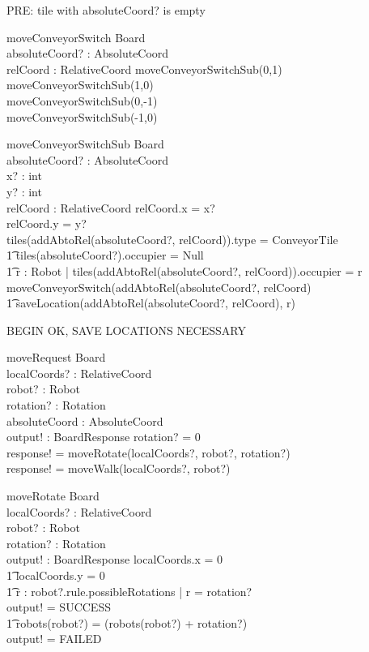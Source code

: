 \documentclass[a4paper,11pt]{article}
\begin{document}
PRE: tile with absoluteCoord? is empty
\begin{schema}{moveConveyorSwitch}
\Delta Board \\
absoluteCoord? : AbsoluteCoord \\
relCoord : RelativeCoord
\where
moveConveyorSwitchSub(0,1) \\
moveConveyorSwitchSub(1,0) \\
moveConveyorSwitchSub(0,-1) \\
moveConveyorSwitchSub(-1,0) \\
\end{schema}

\begin{schema}{moveConveyorSwitchSub}
\Delta Board \\
absoluteCoord? : AbsoluteCoord \\
x? : int \\
y? : int \\
relCoord : RelativeCoord
\where
relCoord.x = x? \\
relCoord.y = y? \\
\IF tiles(addAbtoRel(absoluteCoord?, relCoord)).type = ConveyorTile \\ \t1
tiles(absoluteCoord?).occupier = Null \\ \t1
\exists r : Robot | tiles(addAbtoRel(absoluteCoord?, relCoord)).occupier = r \\
\THEN moveConveyorSwitch(addAbtoRel(absoluteCoord?, relCoord)\\ \t1
saveLocation(addAbtoRel(absoluteCoord?, relCoord), r)
\end{schema}

BEGIN OK, SAVE LOCATIONS NECESSARY
\begin{schema}{moveRequest}
\Delta Board \\
localCoords? : RelativeCoord \\
robot? : Robot \\
rotation? : Rotation \\
absoluteCoord : AbsoluteCoord \\
output! : BoardResponse
\where
\IF rotation? \not = 0 \\
\THEN response! = moveRotate(localCoords?, robot?, rotation?) \\
\ELSE response! = moveWalk(localCoords?, robot?)
\end{schema}

\begin{schema}{moveRotate}
\Delta Board \\
localCoords? : RelativeCoord \\
robot? : Robot \\
rotation? : Rotation \\
output! : BoardResponse
\where
\IF localCoords.x = 0 \\ \t1
localCoords.y = 0 \\ \t1
 \exists r : robot?.rule.possibleRotations | r = rotation?\\
\THEN output! = SUCCESS \\ \t1
robots(robot?) = (robots(robot?) + rotation?)  \\
\ELSE output! = FAILED
\end{schema}
\end{document}
